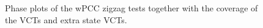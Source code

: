
\begin{figure}[h]
    
    \caption{Phase plots of the wPCC zigzag tests together with the coverage of the VCTs and extra state VCTs.}
    \label{fig:VCT_phase_plot_wPCC}
\end{figure}